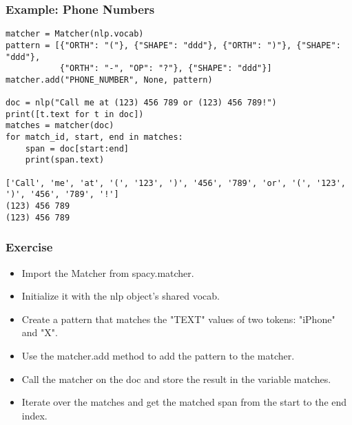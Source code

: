 \begin{frame}[fragile]\frametitle{Example: Phone Numbers}



\begin{lstlisting}
matcher = Matcher(nlp.vocab)
pattern = [{"ORTH": "("}, {"SHAPE": "ddd"}, {"ORTH": ")"}, {"SHAPE": "ddd"},
           {"ORTH": "-", "OP": "?"}, {"SHAPE": "ddd"}]
matcher.add("PHONE_NUMBER", None, pattern)

doc = nlp("Call me at (123) 456 789 or (123) 456 789!")
print([t.text for t in doc])
matches = matcher(doc)
for match_id, start, end in matches:
    span = doc[start:end]
    print(span.text)
		
['Call', 'me', 'at', '(', '123', ')', '456', '789', 'or', '(', '123', ')', '456', '789', '!']
(123) 456 789
(123) 456 789		
\end{lstlisting}


\end{frame}


\begin{frame}[fragile]\frametitle{Exercise}

  \begin{itemize}
	\item Import the Matcher from spacy.matcher.
	\item Initialize it with the nlp object's shared vocab.
	\item Create a pattern that matches the "TEXT" values of two tokens: "iPhone" and "X".
	\item Use the matcher.add method to add the pattern to the matcher.
	\item Call the matcher on the doc and store the result in the variable matches.
	\item Iterate over the matches and get the matched span from the start to the end index.

  \end{itemize}
	
\end{frame}

